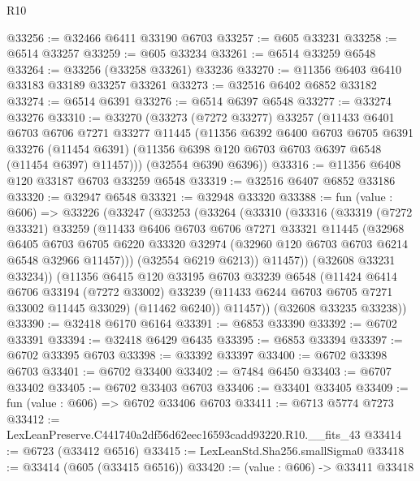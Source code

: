 \begin{lexlean}{R10}
\begin{coremodule}
@33256 := @32466 @6411 @33190 @6703
@33257 := @605 @33231
@33258 := @6514 @33257
@33259 := @605 @33234
@33261 := @6514 @33259 @6548
@33264 := @33256 (@33258 @33261) @33236
@33270 := @11356 @6403 @6410 @33183 @33189 @33257 @33261
@33273 := @32516 @6402 @6852 @33182
@33274 := @6514 @6391
@33276 := @6514 @6397 @6548
@33277 := @33274 @33276
@33310 := @33270
    (@33273
      (@7272 @33277)
      @33257
      (@11433
        @6401
        @6703
        @6706
        @7271
        @33277
        @11445
        (@11356
          @6392
          @6400
          @6703
          @6705
          @6391
          @33276
          (@11454 @6391)
          (@11356 @6398 @120 @6703 @6703 @6397 @6548 (@11454 @6397) @11457)))
      (@32554 @6390 @6396))
@33316 := @11356 @6408 @120 @33187 @6703 @33259 @6548
@33319 := @32516 @6407 @6852 @33186
@33320 := @32947 @6548
@33321 := @32948 @33320
@33388 := fun (value : @606) =>
  @33226
    (@33247
      (@33253
        (@33264
          (@33310
            (@33316
              (@33319
                (@7272 @33321)
                @33259
                (@11433
                  @6406
                  @6703
                  @6706
                  @7271
                  @33321
                  @11445
                  (@32968
                    @6405
                    @6703
                    @6705
                    @6220
                    @33320
                    @32974
                    (@32960 @120 @6703 @6703 @6214 @6548 @32966 @11457)))
                (@32554 @6219 @6213))
              @11457))
          (@32608 @33231 @33234))
        (@11356
          @6415
          @120
          @33195
          @6703
          @33239
          @6548
          (@11424
            @6414
            @6706
            @33194
            (@7272 @33002)
            @33239
            (@11433 @6244 @6703 @6705 @7271 @33002 @11445 @33029)
            (@11462 @6240))
          @11457))
      (@32608 @33235 @33238))
@33390 := @32418 @6170 @6164
@33391 := @6853 @33390
@33392 := @6702 @33391
@33394 := @32418 @6429 @6435
@33395 := @6853 @33394
@33397 := @6702 @33395 @6703
@33398 := @33392 @33397
@33400 := @6702 @33398 @6703
@33401 := @6702 @33400
@33402 := @7484 @6450
@33403 := @6707 @33402
@33405 := @6702 @33403 @6703
@33406 := @33401 @33405
@33409 := fun (value : @606) => @6702 @33406 @6703
@33411 := @6713 @5774 @7273
@33412 := LexLeanPreserve.C441740a2df56d62eec16593cadd93220.R10.__fits_43
@33414 := @6723 (@33412 @6516)
@33415 := LexLeanStd.Sha256.smallSigma0
@33418 := @33414 (@605 (@33415 @6516))
@33420 := (value : @606) -> @33411 @33418

\end{coremodule}
\end{lexlean}
